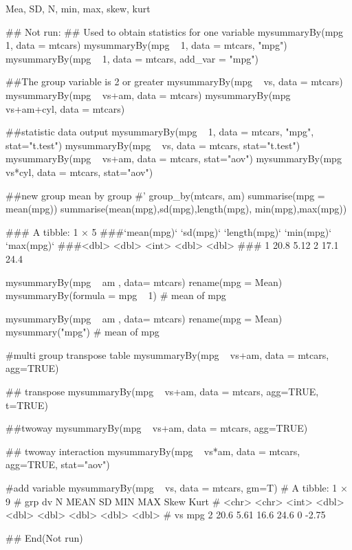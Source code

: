 \documentclass[a4paper]{book}
\begin{document}
%
\begin{Value}
Mea, SD, N, min, max, skew, kurt
\end{Value}
%
\begin{Examples}
\begin{ExampleCode}
\#\# Not run: 
## Used to obtain statistics for one variable
mysummaryBy(mpg ~ 1, data = mtcars)
mysummaryBy(mpg ~ 1, data = mtcars, "mpg")
mysummaryBy(mpg ~ 1, data = mtcars, add_var = "mpg")

##The group variable is 2 or greater
mysummaryBy(mpg ~ vs, data = mtcars)
mysummaryBy(mpg ~ vs+am, data = mtcars)
mysummaryBy(mpg ~ vs+am+cyl, data = mtcars)

##statistic data output
mysummaryBy(mpg ~ 1, data = mtcars, "mpg", stat="t.test")
mysummaryBy(mpg ~ vs, data = mtcars, stat="t.test")
mysummaryBy(mpg ~ vs+am, data = mtcars, stat="aov")
mysummaryBy(mpg ~ vs*cyl, data = mtcars, stat="aov")

##new group mean by group
#' group_by(mtcars, am) %
 summarise(mpg = mean(mpg)) %
  summarise(mean(mpg),sd(mpg),length(mpg), min(mpg),max(mpg))

### A tibble: 1 × 5
###`mean(mpg)` `sd(mpg)` `length(mpg)` `min(mpg)` `max(mpg)`
###<dbl>     <dbl>         <int>      <dbl>      <dbl>
###  1        20.8      5.12             2       17.1       24.4

mysummaryBy(mpg ~ am , data= mtcars) %
    rename(mpg = Mean) %
      mysummaryBy(formula = mpg ~ 1)  # mean of mpg

mysummaryBy(mpg ~ am , data= mtcars) %
    rename(mpg = Mean) %
      mysummary("mpg")  # mean of mpg

#multi group transpose table
mysummaryBy(mpg ~ vs+am, data = mtcars, agg=TRUE)

## transpose
mysummaryBy(mpg ~ vs+am, data = mtcars, agg=TRUE, t=TRUE)

##twoway
mysummaryBy(mpg ~ vs+am, data = mtcars, agg=TRUE)


## twoway interaction
mysummaryBy(mpg ~ vs*am, data = mtcars, agg=TRUE, stat="aov")

#add variable
mysummaryBy(mpg ~ vs, data = mtcars, gm=T)
# A tibble: 1 × 9
# grp   dv        N  MEAN    SD   MIN   MAX  Skew  Kurt
# <chr> <chr> <int> <dbl> <dbl> <dbl> <dbl> <dbl> <dbl>
#  vs    mpg       2  20.6  5.61  16.6  24.6     0 -2.75


## End(Not run)



\end{ExampleCode}
\end{Examples}
\end{document}
